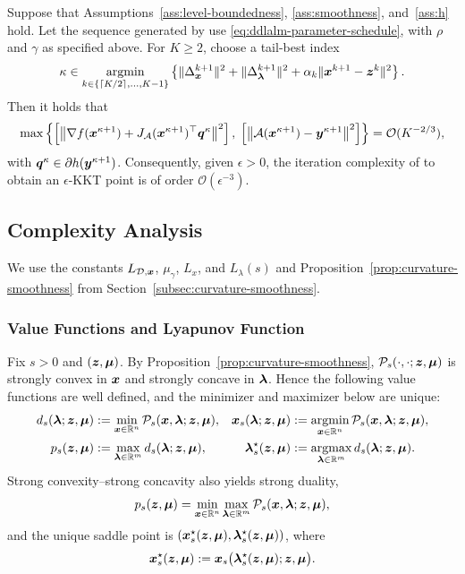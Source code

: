 \begin{theorem}
\label{thm:main}
Suppose that Assumptions~\ref{ass:level-boundedness},
\ref{ass:smoothness}, and~\ref{ass:h} hold.
Let the sequence generated by  use
\eqref{eq:ddlalm-parameter-schedule}, with $\rho$ and $\gamma$ as specified
above. For $K\ge2$, choose a tail-best index
\[
    \kappa\in\operatorname*{\mathrm{argmin}}_{k\in\{\lceil K/2\rceil,\ldots,K-1\}}
    \left\{
        \|\Delta_{\bm{x}}^{k+1}\|^2
        +\|\Delta_{\bm{\lambda}}^{k+1}\|^2
        +\alpha_k\|\bm{x}^{k+1}-\bm{z}^k\|^2
    \right\}.
\]
Then it holds that
\[
\max\left\{
\left[
    \left\|
        \nabla f({\bm{x}}^{\kappa+1})
        +
        J_{\cal A}({\bm{x}}^{\kappa+1})^\top{\bm{q}}^{\kappa}
    \right\|^2
\right],
\;
\left[
    \left\|
        {\cal A}({\bm{x}}^{\kappa+1})-{\bm{y}}^{\kappa+1}
    \right\|^2
\right]
\right\}
=
\mathcal O(K^{-2/3}),
\]
with \({\bm{q}}^{\kappa}\in\partial h({\bm{y}}^{\kappa+1})\).
Consequently, given \(\epsilon>0\), the iteration complexity of
 to obtain an \(\epsilon\)-KKT point
is of order \(\mathcal O(\epsilon^{-3})\).
\end{theorem}



\subsection{Complexity Analysis}
\label{sec:complexity-analysis}
\label{sec:basic-descent}
We use the constants \(L_{\mathcal{D},\bm{x}}\), \(\mu_\gamma\), \(L_x\), and
\(L_\lambda(s)\) and Proposition~\ref{prop:curvature-smoothness} from
Section~\ref{subsec:curvature-smoothness}.
 
\subsubsection{Value Functions and Lyapunov Function}
\label{subsec:value-functions}

Fix $s>0$ and $(\bm{z},\bm{\mu})$. By Proposition~\ref{prop:curvature-smoothness},
$\mathcal P_s(\cdot,\cdot;\bm{z},\bm{\mu})$ is strongly convex in $\bm{x}$ and strongly
concave in $\bm{\lambda}$. Hence the following value functions are well defined,
and the minimizer and maximizer below are unique:
\begin{align}
    d_s(\bm{\lambda};\bm{z},\bm{\mu})
    &:= \min_{\bm{x}\in\mathbb{R}^n}\mathcal P_s(\bm{x},\bm{\lambda};\bm{z},\bm{\mu}),
    &
    \bm{x}_s(\bm{\lambda};\bm{z},\bm{\mu})
    &:= \operatorname*{\mathrm{argmin}}_{\bm{x}\in\mathbb{R}^n}\mathcal P_s(\bm{x},\bm{\lambda};\bm{z},\bm{\mu}),
    \label{eq:dual-value}\\
    p_s(\bm{z},\bm{\mu})
    &:= \max_{\bm{\lambda}\in\mathbb{R}^m} d_s(\bm{\lambda};\bm{z},\bm{\mu}),
    &
    \bm{\lambda}_s^\star(\bm{z},\bm{\mu})
    &:= \operatorname*{\mathrm{argmax}}_{\bm{\lambda}\in\mathbb{R}^m} d_s(\bm{\lambda};\bm{z},\bm{\mu}).
    \label{eq:saddle-value}
\end{align}
Strong convexity--strong concavity also yields strong duality,
\begin{equation}
    p_s(\bm{z},\bm{\mu})
    = \min_{\bm{x}\in\mathbb{R}^n}\max_{\bm{\lambda}\in\mathbb{R}^m}
      \mathcal P_s(\bm{x},\bm{\lambda};\bm{z},\bm{\mu}),
    \label{eq:minimax-equality}
\end{equation}
and the unique saddle point is
$(\bm{x}_s^\star(\bm{z},\bm{\mu}),\bm{\lambda}_s^\star(\bm{z},\bm{\mu}))$, where
\[
    \bm{x}_s^\star(\bm{z},\bm{\mu})
    :=\bm{x}_s\bigl(\bm{\lambda}_s^\star(\bm{z},\bm{\mu});\bm{z},\bm{\mu}\bigr).
\]

